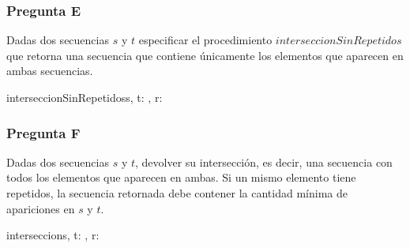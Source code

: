 \subsubsection{Pregunta E}

Dadas dos secuencias $s$ y $t$ especificar el procedimiento $interseccionSinRepetidos$ que retorna una secuencia que contiene únicamente los elementos que aparecen en ambas secuencias.

\begin{proc}{interseccionSinRepetidos}{\In s, t: , \Out r: }{}
\end{proc}

\subsubsection{Pregunta F}

Dadas dos secuencias $s$ y $t$, devolver su intersección, es decir, una secuencia con todos los elementos que aparecen en ambas. Si un mismo elemento tiene repetidos, la secuencia retornada debe contener la cantidad mínima de apariciones en $s$ y $t$.


\begin{proc}{interseccion}{\In s, t: , \Out r: }{}
\end{proc}


